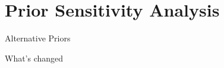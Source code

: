 \documentclass{beamer}
\begin{document}
      



\section{Prior Sensitivity Analysis}

\begin{frame}{Alternative Priors}
\end{frame}

\begin{frame}{What's changed}
    
\end{frame}







 
  

\end{document}
